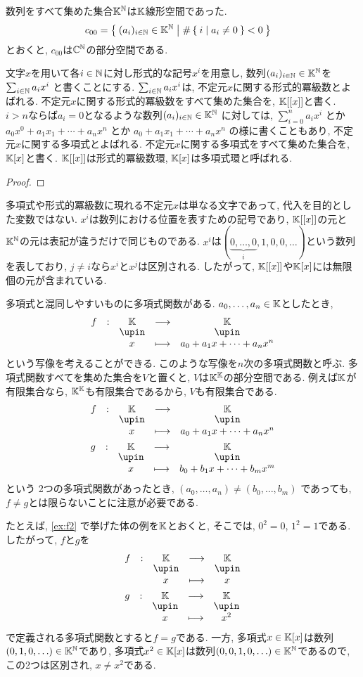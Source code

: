 \begin{example}
  数列をすべて集めた集合$\mathbb{K}^{\mathbb{N}}$は$\mathbb{K}$線形空間であった.
  \begin{align*}
    c_{00}&=\Set{(a_i)_{i\in\mathbb{N}} \in \mathbb{K}^{\mathbb{N}} | \#\Set{i| a_i \neq 0} < 0}
  \end{align*}
  とおくと, $c_{00}$は$\mathbb{C}^{\mathbb{N}}$の部分空間である.
  
  文字$x$を用いて各$i\in\mathbb{N}$に対し形式的な記号$x^i$を用意し,
  数列$(a_i)_{i\in\mathbb{N}} \in \mathbb{K}^{\mathbb{N}}$を
  $\sum_{i\in \mathbb{N}} a_ix^i$
  と書くことにする.
  $\sum_{i\in \mathbb{N}} a_ix^i$は,
  不定元$x$に関する形式的冪級数とよばれる.
  不定元$x$に関する形式的冪級数をすべて集めた集合を,
  $\mathbb{K}[[x]]$と書く.
  $i>n$ならば$a_i=0$となるような数列$(a_i)_{i\in\mathbb{N}} \in \mathbb{K}^{\mathbb{N}}$
  に対しては,
  $\sum_{i=0}^{n} a_ix^i$
  とか
  $a_0x^0+a_1x_1+\cdots+a_nx^n$
  とか
  $a_0+a_1x_1+\cdots+a_nx^n$
  の様に書くこともあり,
  不定元$x$に関する多項式とよばれる.
  不定元$x$に関する多項式をすべて集めた集合を,
  $\mathbb{K}[x]$と書く.
  $\mathbb{K}[[x]]$は形式的冪級数環,
  $\mathbb{K}[x]$は多項式環と呼ばれる.
\end{example}
\begin{proof}\end{proof}
\begin{remark}
  多項式や形式的冪級数に現れる不定元$x$は単なる文字であって,
  代入を目的とした変数ではない.
  $x^i$は数列における位置を表すための記号であり,
  $\mathbb{K}[[x]]$の元と$\mathbb{K}^{\mathbb{N}}$の元は表記が違うだけで同じものである.
  $x^i$は$(\underbrace{0,\ldots,0}_{i},1,0,0,\ldots)$という数列を表しており,
  $j\neq i$なら$x^i$と$x^j$は区別される.
  したがって,
  $\mathbb{K}[[x]]$や$\mathbb{K}[x]$には無限個の元が含まれている.

  多項式と混同しやすいものに多項式関数がある.
  $a_0,\ldots, a_n\in \mathbb{K}$としたとき,
  \begin{align*}
  \shazo{f}{\KK}{\KK}
  {x}{a_0+a_1x+\cdots+a_nx^n}
  \end{align*}
  という写像を考えることができる.
  このような写像を$n$次の多項式関数と呼ぶ.
  多項式関数すべてを集めた集合を$V$と置くと,
  $V$は$\mathbb{K}^{\mathbb{K}}$の部分空間である.
  例えば$\mathbb{K}$が有限集合なら,
  $\mathbb{K}^{\mathbb{K}}$も有限集合であるから,
  $V$も有限集合である.
  \begin{align*}
  &\shazo{f}{\KK}{\KK}
  {x}{a_0+a_1x+\cdots+a_nx^n}
  \\
  &\shazo{g}{\KK}{\KK}
  {x}{b_0+b_1x+\cdots+b_mx^m}
  \end{align*}
  という
  2つの多項式関数があったとき,
  $(a_0,\ldots,a_n)\neq (b_0,\ldots,b_m)$
  であっても, $f\neq g$とは限らないことに注意が必要である.

  たとえば,
  \cref{ex:f2}
  で挙げた体の例を$\mathbb{K}$とおくと,
  そこでは, $0^2=0$, $1^2=1$である.
  したがって, $f$と$g$を
  \begin{align*}
  &\shazo{f}{\KK}{\KK}
  {x}{x}
  \\
  &\shazo{g}{\KK}{\KK}
  {x}{x^2}
  \end{align*}
  で定義される多項式関数とすると$f=g$である.
  一方, 多項式$x\in\mathbb{K}[x]$は数列$(0,1,0,\ldots)\in\mathbb{K}^{\mathbb{N}}$であり,
  多項式$x^2\in\mathbb{K}[x]$は数列$(0,0,1,0,\ldots)\in\mathbb{K}^{\mathbb{N}}$であるので,
  この2つは区別され, $x\neq x^2$である.
\end{remark}

